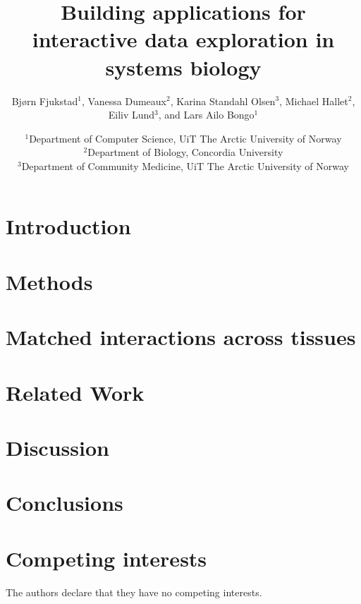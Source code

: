 \documentclass[twocolumn]{article}
\author{Bjørn Fjukstad$^1$, Vanessa Dumeaux$^2$, Karina Standahl Olsen$^3$,
Michael Hallet$^2$, \\Eiliv Lund$^3$, and Lars Ailo Bongo$^1$}
\date{
    $^1$Department of Computer Science, UiT The Arctic University of Norway\\
    $^2$Department of Biology, Concordia University\\
    $^3$Department of Community Medicine, UiT The Arctic University of
    Norway\\[2ex]
}
\begin{document}
\title{Building applications for interactive data exploration in systems biology}

\maketitle

 


\section*{Introduction}
 

\section*{Methods} 
 

\section*{Matched interactions across tissues}
 

\section*{Related Work}
 

\section*{Discussion} 
 

\section*{Conclusions}
 

\section*{Competing interests}
The authors declare that they have no competing interests.



\end{document}
